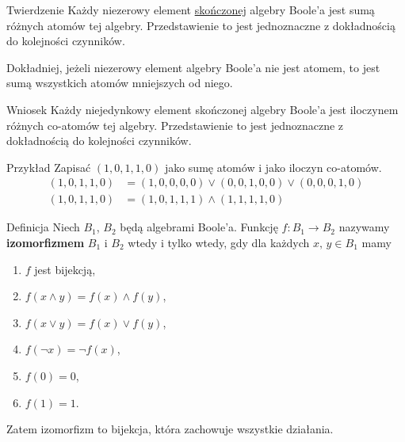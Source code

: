 \documentclass[a4paper,10pt]{beamer}
\begin{document}
\begin{frame}
	
	\begin{block}{Twierdzenie}
		Każdy niezerowy element \underline{skończonej} algebry Boole'a jest sumą różnych atomów tej algebry. Przedstawienie to jest jednoznaczne z dokładnością do kolejności czynników. 
	\end{block}

	Dokładniej, jeżeli niezerowy element algebry Boole'a nie jest atomem, to jest sumą wszystkich atomów mniejszych od niego. 
	
	\begin{block}{Wniosek}
		Każdy niejedynkowy element skończonej algebry Boole'a jest iloczynem różnych co-atomów tej algebry. Przedstawienie to jest jednoznaczne z dokładnością do kolejności czynników. 
	\end{block}

	\begin{exampleblock}{Przykład}
		Zapisać $(1,0,1,1,0)$ jako sumę atomów i jako iloczyn co-atomów.
		\begin{align*}
			(1,0,1,1,0)&=(1,0,0,0,0)\vee(0,0,1,0,0)\vee(0,0,0,1,0)\\
			(1,0,1,1,0)&=(1,0,1,1,1)\wedge(1,1,1,1,0)
		\end{align*}
	\end{exampleblock}
	
\end{frame}



\begin{frame}
	
	\begin{block}{Definicja}
		Niech $B_1$, $B_2$ będą algebrami Boole'a. Funkcję $f:B_1\to B_2$ nazywamy {\bf izomorfizmem} $B_1$ i $B_2$ wtedy i tylko wtedy, gdy dla każdych $x,\,y\in B_1$ mamy
		\begin{enumerate}
			\item $f$ jest bijekcją,
			\item $f(x\wedge y)=f(x)\wedge f(y)$,
			\item $f(x\vee y)=f(x)\vee f(y)$,
			\item $f(\neg x)=\neg f(x)$,
			\item $f(0)=0$,
			\item $f(1)=1$.
		\end{enumerate}
	\end{block}
	
	Zatem izomorfizm to bijekcja, która zachowuje wszystkie działania.
\end{frame}
\end{document}
